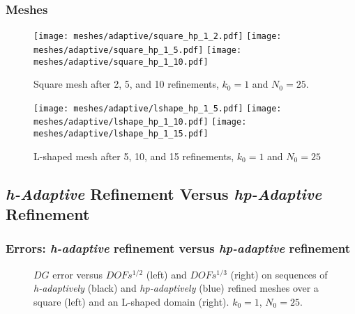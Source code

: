 \begin{frame}
    \frametitle{Meshes}

    \begin{figure}[!ht]
        \centering
        \texttt{[image: meshes/adaptive/square\_hp\_1\_2.pdf]}
        \texttt{[image: meshes/adaptive/square\_hp\_1\_5.pdf]}
        \texttt{[image: meshes/adaptive/square\_hp\_1\_10.pdf]}
        \caption{Square mesh after 2, 5, and 10 refinements, $k_0 = 1$ and $N_0 = 25$.}
    \end{figure}
    
    \begin{figure}[!ht]
        \centering
        \texttt{[image: meshes/adaptive/lshape\_hp\_1\_5.pdf]}
        \texttt{[image: meshes/adaptive/lshape\_hp\_1\_10.pdf]}
        \texttt{[image: meshes/adaptive/lshape\_hp\_1\_15.pdf]}
        \caption{L-shaped mesh after 5, 10, and 15 refinements, $k_0 = 1$ and $N_0 = 25$}
    \end{figure}
\end{frame}

\subsection{\textit{h-Adaptive} Refinement Versus \textit{hp-Adaptive} Refinement}

\begin{frame}[fragile]
    \frametitle{Errors: \textit{h-adaptive} refinement versus \textit{hp-adaptive} refinement}

    \begin{figure}[!ht]
        
        \caption{$DG$ error versus $DOFs^{1/2}$ (left) and $DOFs^{1/3}$ (right) on sequences of \textit{h-adaptively} (black) and \textit{hp-adaptively} (blue) refined meshes over a square (left) and an L-shaped domain (right). $k_0 = 1$, $N_0 = 25$.}
    \end{figure}
\end{frame}